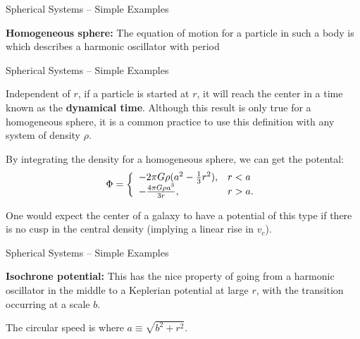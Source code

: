 \documentclass[letterpaper,landscape]{slides}
\begin{document}
\begin{slide}
\begin{center}
{\large \color{red} 
                      Spherical Systems -- Simple Examples}
\end{center}

{\bf Homogeneous sphere:}
The equation of motion for a particle in such a body is
which describes a harmonic oscillator with period

\vfill
\end{slide}


\begin{slide}
\begin{center}
{\large \color{red} 
                      Spherical Systems -- Simple Examples}
\end{center}


Independent of $r$, if a particle is started at $r$, it will reach the
center in a time
known as the {\bf dynamical time}.  Although this result is only true
for a homogeneous sphere, it is a common practice to use this definition
with any system of density $\rho$.

By integrating the density for a homogeneous sphere, we can get the potental:
$$
\Phi = \left\{ \begin{array}{ll} -2\pi G \rho(a^2 - \frac{1}{3} r^2),
& r < a \\ - {4\pi G \rho a^3 \over 3 r}, & r > a. \end{array}\right.
$$

One would expect the center of a galaxy to have a potential of this
type if there is no cusp in the central density (implying a linear
rise in $v_c$).



\vfill
\end{slide}



\begin{slide}
\begin{center}
{\large \color{red} 
                      Spherical Systems -- Simple Examples}
\end{center}


{\bf Isochrone potential:}
This has the nice property of going from a harmonic oscillator in the
middle to a Keplerian potential at large $r$, with the transition
occurring at a scale $b$.

The circular speed is
where $a \equiv \sqrt{b^2 + r^2}$.

\vfill
\end{slide}
\end{document}
